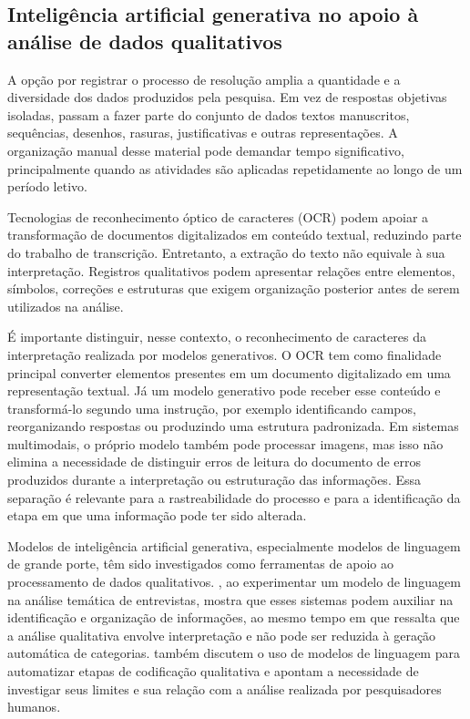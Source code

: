 \subsection{Inteligência artificial generativa no apoio à análise de dados qualitativos}
\label{subsec:ia-generativa}

A opção por registrar o processo de resolução amplia a quantidade e a diversidade dos dados produzidos pela pesquisa. Em vez de respostas objetivas isoladas, passam a fazer parte do conjunto de dados textos manuscritos, sequências, desenhos, rasuras, justificativas e outras representações. A organização manual desse material pode demandar tempo significativo, principalmente quando as atividades são aplicadas repetidamente ao longo de um período letivo.

Tecnologias de reconhecimento óptico de caracteres (OCR) podem apoiar a transformação de documentos digitalizados em conteúdo textual, reduzindo parte do trabalho de transcrição. Entretanto, a extração do texto não equivale à sua interpretação. Registros qualitativos podem apresentar relações entre elementos, símbolos, correções e estruturas que exigem organização posterior antes de serem utilizados na análise.

É importante distinguir, nesse contexto, o reconhecimento de caracteres da interpretação realizada por modelos generativos. O OCR tem como finalidade principal converter elementos presentes em um documento digitalizado em uma representação textual. Já um modelo generativo pode receber esse conteúdo e transformá-lo segundo uma instrução, por exemplo identificando campos, reorganizando respostas ou produzindo uma estrutura padronizada. Em sistemas multimodais, o próprio modelo também pode processar imagens, mas isso não elimina a necessidade de distinguir erros de leitura do documento de erros produzidos durante a interpretação ou estruturação das informações. Essa separação é relevante para a rastreabilidade do processo e para a identificação da etapa em que uma informação pode ter sido alterada.

Modelos de inteligência artificial generativa, especialmente modelos de linguagem de grande porte, têm sido investigados como ferramentas de apoio ao processamento de dados qualitativos. , ao experimentar um modelo de linguagem na análise temática de entrevistas, mostra que esses sistemas podem auxiliar na identificação e organização de informações, ao mesmo tempo em que ressalta que a análise qualitativa envolve interpretação e não pode ser reduzida à geração automática de categorias.  também discutem o uso de modelos de linguagem para automatizar etapas de codificação qualitativa e apontam a necessidade de investigar seus limites e sua relação com a análise realizada por pesquisadores humanos.

